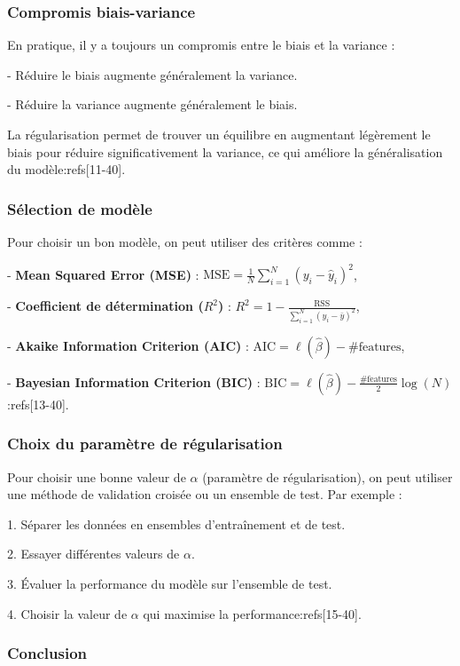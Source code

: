 \documentclass[10pt,a4paper]{article}
\begin{document}
\subsubsection*{Compromis biais-variance}

En pratique, il y a toujours un compromis entre le biais et la variance :

- Réduire le biais augmente généralement la variance.

- Réduire la variance augmente généralement le biais.

La régularisation permet de trouver un équilibre en augmentant légèrement le biais pour réduire significativement la variance, ce qui améliore la généralisation du modèle:refs[11-40].

\subsubsection*{Sélection de modèle}

Pour choisir un bon modèle, on peut utiliser des critères comme :

- \textbf{Mean Squared Error (MSE)} : $\text{MSE} = \frac{1}{N} \sum_{i=1}^{N}(y_i - \hat{y}_i)^2$,

- \textbf{Coefficient de détermination ($R^2$)} : $R^2 = 1 - \frac{\text{RSS}}{\sum_{i=1}^{N}(y_i - \bar{y})^2}$,

- \textbf{Akaike Information Criterion (AIC)} : $\text{AIC} = \ell(\hat{\beta}) - \text{\# features}$,

- \textbf{Bayesian Information Criterion (BIC)} : $\text{BIC} = \ell(\hat{\beta}) - \frac{\text{\# features}}{2} \log(N)$:refs[13-40].

\subsubsection*{Choix du paramètre de régularisation}

Pour choisir une bonne valeur de $\alpha$ (paramètre de régularisation), on peut utiliser une méthode de validation croisée ou un ensemble de test. Par exemple :

1. Séparer les données en ensembles d'entraînement et de test.

2. Essayer différentes valeurs de $\alpha$.

3. Évaluer la performance du modèle sur l'ensemble de test.

4. Choisir la valeur de $\alpha$ qui maximise la performance:refs[15-40].

\subsubsection*{Conclusion}
\end{document}
